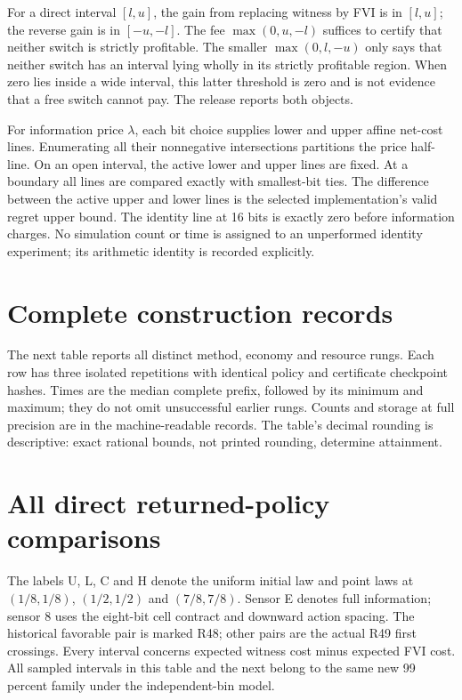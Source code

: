\documentclass[ecta,nameyear,draft]{econsocart}
\begin{document}
For a direct interval $[l,u]$, the gain from replacing witness by FVI is in $[l,u]$; the reverse gain is in $[-u,-l]$. The fee $\max(0,u,-l)$ suffices to certify that neither switch is strictly profitable. The smaller $\max(0,l,-u)$ only says that neither switch has an interval lying wholly in its strictly profitable region. When zero lies inside a wide interval, this latter threshold is zero and is not evidence that a free switch cannot pay. The release reports both objects.

For information price $\lambda$, each bit choice supplies lower and upper affine net-cost lines. Enumerating all their nonnegative intersections partitions the price half-line. On an open interval, the active lower and upper lines are fixed. At a boundary all lines are compared exactly with smallest-bit ties. The difference between the active upper and lower lines is the selected implementation's valid regret upper bound. The identity line at 16 bits is exactly zero before information charges. No simulation count or time is assigned to an unperformed identity experiment; its arithmetic identity is recorded explicitly.


\section{Complete construction records}\label{supp:records49}
The next table reports all distinct method, economy and resource rungs. Each row has three isolated repetitions with identical policy and certificate checkpoint hashes. Times are the median complete prefix, followed by its minimum and maximum; they do not omit unsuccessful earlier rungs. Counts and storage at full precision are in the machine-readable records. The table's decimal rounding is descriptive: exact rational bounds, not printed rounding, determine attainment.


\section{All direct returned-policy comparisons}\label{supp:direct49}
The labels U, L, C and H denote the uniform initial law and point laws at $(1/8,1/8)$, $(1/2,1/2)$ and $(7/8,7/8)$. Sensor E denotes full information; sensor 8 uses the eight-bit cell contract and downward action spacing. The historical favorable pair is marked R48; other pairs are the actual R49 first crossings. Every interval concerns expected witness cost minus expected FVI cost. All sampled intervals in this table and the next belong to the same new 99 percent family under the independent-bin model.

\end{document}
